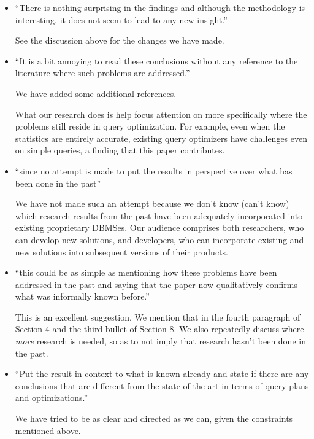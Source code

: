 \documentclass{sig-alternate}
\begin{document}
\newpage%
\begin{itemize}
\item ``There is nothing surprising in the findings and although the
  methodology is interesting, it does not seem to lead to any new insight.''

See the discussion above for the changes we have made.

\item ``It is a bit annoying to read these conclusions without any reference
  to the literature where such problems are addressed.''

We have added some additional references.

What our research does is help focus attention on more specifically where
the problems still reside in query optimization. For example, even when the
statistics are entirely accurate, existing query optimizers have challenges
even on simple queries, a finding that this paper contributes.

\item ``since no attempt is made to put the results in perspective over what
  has been done in the past''

We have not made such an attempt because we don't know (can't know) which
research results from the past have been adequately incorporated  into
existing proprietary DBMSes. Our audience comprises both researchers, who
can develop new solutions, and developers, who can incorporate existing and
new solutions into subsequent versions of their products.

\item ``this could be as simple as mentioning how these problems have been
  addressed in the past and saying that the paper now qualitatively confirms
  what was informally known before.''

This is an excellent suggestion. We mention that in the fourth paragraph of Section
4 and the third bullet of Section 8. We also repeatedly discuss where {\em
  more} research is needed, so as to not imply that research hasn't been
done in the past.

\item ``Put the result in context to what is known already and state if
  there are any conclusions that are different from the state-of-the-art in
  terms of query plans and optimizations.''

We have tried to be as clear and directed as we can, given the constraints
mentioned above.
\end{itemize}
\end{document}
